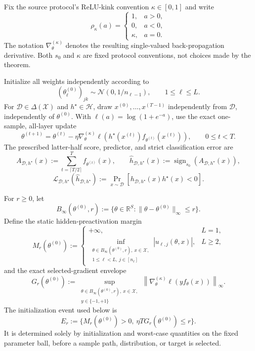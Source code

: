 Fix the source protocol's ReLU-kink convention $\kappa\in[0,1]$ and write
\[
\rho_\kappa(a)=
\begin{cases}
1,&a>0,\\
0,&a<0,\\
\kappa,&a=0.
\end{cases}
\]
The notation $\nabla_\theta^{(\kappa)}$ denotes the resulting single-valued
back-propagation derivative.  Both $s_0$ and $\kappa$ are fixed protocol
conventions, not choices made by the theorem.

Initialize all weights independently according to
\[
(\theta_\ell^{(0)})_{jk}\sim\mathcal N(0,1/n_{\ell-1}),
\qquad 1\leq\ell\leq L.
\tag{3}
\]
For $\mathcal D\in\Delta(\mathcal X)$ and $h^\star\in\mathcal H$, draw
$x^{(0)},\ldots,x^{(T-1)}$ independently from $\mathcal D$, independently
of $\theta^{(0)}$.  With $\ell(a)=\log(1+e^{-a})$, use the exact one-sample,
all-layer update
\[
\theta^{(t+1)}=\theta^{(t)}-
\eta\nabla_\theta^{(\kappa)}
\ell\!\left(h^\star(x^{(t)})f_{\theta^{(t)}}(x^{(t)})\right),
\qquad 0\leq t<T.
\tag{4}
\]
The prescribed latter-half score, predictor, and strict classification error
are
\[
A_{\mathcal D,h^\star}(x)
:=\sum_{t=\lceil T/2\rceil}^{T}f_{\theta^{(t)}}(x),
\qquad
\widehat h_{\mathcal D,h^\star}(x)
:=\operatorname{sign}_{s_0}(A_{\mathcal D,h^\star}(x)),
\tag{5}
\]
\[
\mathcal L_{\mathcal D,h^\star}
(\widehat h_{\mathcal D,h^\star})
:=\Pr_{x\sim\mathcal D}\!\left[
\widehat h_{\mathcal D,h^\star}(x)h^\star(x)<0
\right].
\tag{6}
\]

For $r\geq0$, let
\[
B_\infty(\theta^{(0)},r)
:=\{\theta\in\mathbb R^S:
\|\theta-\theta^{(0)}\|_\infty\leq r\}.
\tag{7}
\]
Define the static hidden-preactivation margin
\[
M_r(\theta^{(0)}):=
\begin{cases}
+\infty,&L=1,\\[1mm]
\displaystyle
\inf_{\substack{\theta\in B_\infty(\theta^{(0)},r),\ x\in\mathcal X,\\
1\leq\ell<L,\ j\in[n_\ell]}}
|u_{\ell,j}(\theta,x)|,&L\geq2,
\end{cases}
\tag{8}
\]
and the exact selected-gradient envelope
\[
G_r(\theta^{(0)}):=
\sup_{\substack{\theta\in B_\infty(\theta^{(0)},r),\ x\in\mathcal X,\\
y\in\{-1,+1\}}}
\left\|\nabla_\theta^{(\kappa)}\ell(yf_\theta(x))\right\|_\infty.
\tag{9}
\]
The initialization event used below is
\[
E_r:=\{M_r(\theta^{(0)})>0,
\ \eta T G_r(\theta^{(0)})\leq r\}.
\tag{10}
\]
It is determined solely by initialization and worst-case quantities on the
fixed parameter ball, before a sample path, distribution, or target is
selected.

